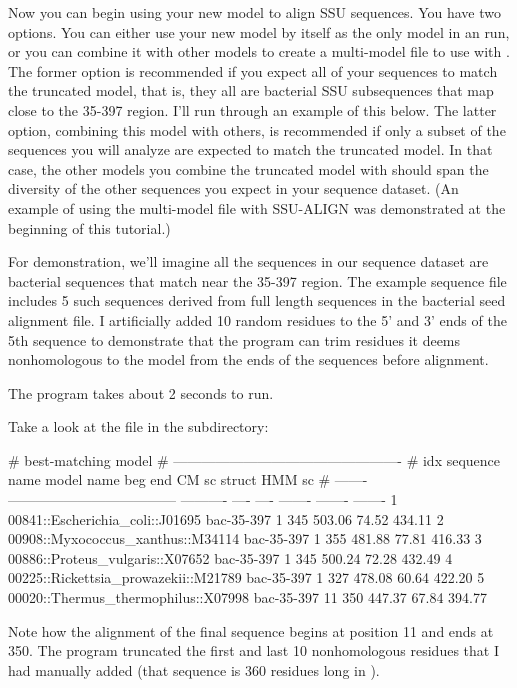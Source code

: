 Now you can begin using your new model  to align
SSU sequences. You have two options.  You can either use your new
model by itself as the only model in an  run, or you
can combine it with other models to create a multi-model file to use
with . The former option is recommended if you expect
all of your sequences to match the truncated model, that is, they all
are bacterial SSU subsequences that map close to the 35-397
region. I'll run through an example of this below. The latter option,
combining this model with others, is recommended if only a subset of
the sequences you will analyze are expected to match the truncated
model. In that case, the other models you combine the truncated model
with should span the diversity of the other sequences you expect in
your sequence dataset. (An example of using the multi-model file
 with SSU-ALIGN was
demonstrated at the beginning of this tutorial.)

For demonstration, we'll imagine all the sequences in our sequence
dataset are bacterial sequences that match near the 35-397 region. The
example sequence file  includes 5 such sequences
derived from full length sequences in the bacterial seed alignment
 file. I artificially added 10
random residues to the 5' and 3' ends of the 5th sequence to
demonstrate that the program can trim residues it deems nonhomologous
to the model from the ends of the sequences before alignment.


The program takes about 2 seconds to run. 

Take a look at the  file in the 
subdirectory:

\begin{sreoutputtiny}
#                                                               best-matching model               
#                                                -------------------------------------------------
#     idx  sequence name                         model name   beg   end    CM sc   struct   HMM sc
# -------  ------------------------------------  ----------  ----  ----  -------  -------  -------
        1  00841::Escherichia_coli::J01695       bac-35-397     1   345   503.06    74.52   434.11
        2  00908::Myxococcus_xanthus::M34114     bac-35-397     1   355   481.88    77.81   416.33
        3  00886::Proteus_vulgaris::X07652       bac-35-397     1   345   500.24    72.28   432.49
        4  00225::Rickettsia_prowazekii::M21789  bac-35-397     1   327   478.08    60.64   422.20
        5  00020::Thermus_thermophilus::X07998   bac-35-397    11   350   447.37    67.84   394.77
\end{sreoutputtiny}

Note how the alignment of the final sequence begins at position 11 and
ends at 350. The program truncated the first and last 10 nonhomologous
residues that I had manually added (that sequence is 360 residues long
in ).
